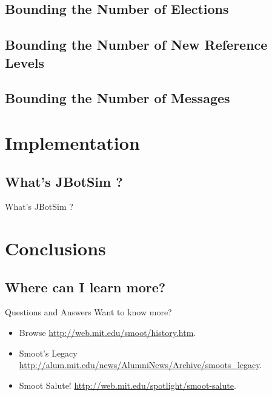 \documentclass{beamer}
\begin{document}
\subsection{Bounding the Number of Elections}

\subsection{Bounding the Number of New Reference Levels}

\subsection{Bounding the Number of Messages}

\section{Implementation}
\subsection{What's JBotSim ?}

\begin{frame}{What's JBotSim ?}

\end{frame}

\section{Conclusions}
\subsection{Where can I learn more?}
\begin{frame}{Questions and Answers}
  Want to know more?

  \begin{itemize}
    \item Browse \url{http://web.mit.edu/smoot/history.htm}.
    \item Smoot's Legacy \url{http://alum.mit.edu/news/AlumniNews/Archive/smoots_legacy}.
    \item Smoot Salute! \url{http://web.mit.edu/spotlight/smoot-salute}.
  \end{itemize}
  
\end{frame}
\end{document}
